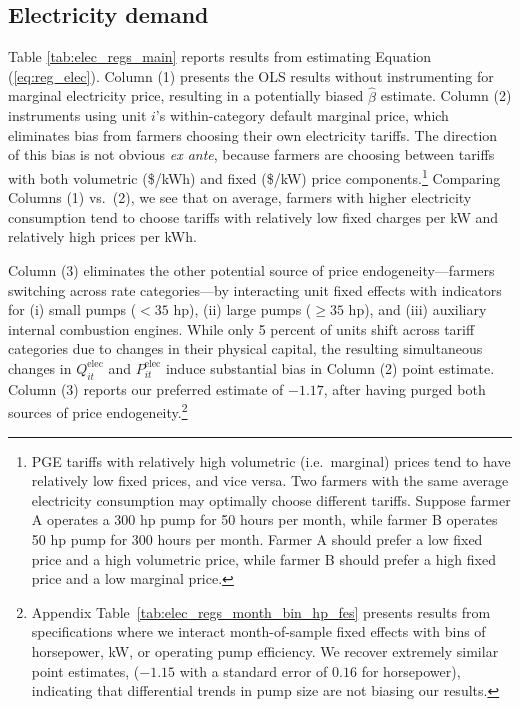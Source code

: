 %
%

\subsection{Electricity demand}
\label{sec:results_elec_demand}

Table \ref{tab:elec_regs_main} reports results from estimating Equation (\ref{eq:reg_elec}). Column (1) presents the OLS results without instrumenting for marginal electricity price, resulting in a potentially biased $\hat\beta$ estimate. 
Column (2) instruments using unit $i$'s within-category default marginal price, which eliminates bias from farmers choosing their own electricity tariffs. The direction of this bias is not obvious \emph{ex ante}, because farmers are choosing between tariffs with both volumetric (\$/kWh) and fixed (\$/kW) price components.\footnote{
PGE tariffs with relatively high volumetric (i.e.\ marginal) prices tend to have relatively low fixed prices, and vice versa. Two farmers with the same average electricity consumption may optimally choose different tariffs. Suppose farmer A operates a 300 hp pump for 50 hours per month, while farmer B operates 50 hp pump for 300 hours per month. Farmer A should prefer a low fixed price and a high volumetric price, while farmer B should prefer a high fixed price and a low marginal price.
}
Comparing Columns (1) vs.\ (2), we see that on average, farmers with higher electricity consumption tend to choose  tariffs with relatively low fixed charges per kW and relatively high prices per kWh.

Column (3) eliminates the other potential source of price endogeneity---farmers switching across rate categories---by interacting unit fixed effects with indicators for (i) small pumps ($<35$ hp), (ii) large pumps ($\ge35$ hp), and (iii) auxiliary internal combustion engines. While only 5 percent of units shift across tariff categories due to changes in their physical capital, the resulting simultaneous changes in $Q^{\text{elec}}_{it}$ and $P^{\text{elec}}_{it}$ induce substantial bias in Column (2) point estimate. Column (3) reports our preferred estimate of $-1.17$, after having purged both sources of price endogeneity.\footnote{Appendix Table~\ref{tab:elec_regs_month_bin_hp_fes} presents results from specifications where we interact month-of-sample fixed effects with bins of horsepower, kW, or operating pump efficiency. We recover extremely similar point estimates, ($-1.15$ with a standard error of $0.16$ for horsepower), indicating that differential trends in pump size are not biasing our results.}

